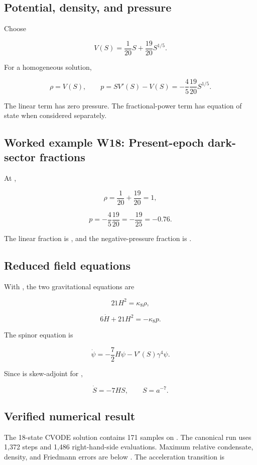 \documentclass[11pt]{article}
\begin{document}
\subsection{Potential, density, and pressure}

Choose

\[
V(S)=\frac1{20}S+\frac{19}{20}S^{1/5}.
\]

For a homogeneous solution,

\[
\rho=V(S),
\qquad
p=SV'(S)-V(S)=-\frac45\frac{19}{20}S^{1/5}.
\]

The linear term has zero pressure. The fractional-power term has equation of state \texttt{} when considered separately.

\subsection{Worked example W18: Present-epoch dark-sector fractions}

At \texttt{},

\[
\rho=\frac1{20}+\frac{19}{20}=1,
\]

\[
p=-\frac45\frac{19}{20}=-\frac{19}{25}=-0.76.
\]

The linear fraction is \texttt{}, and the negative-pressure fraction is \texttt{}.

\subsection{Reduced field equations}

With \texttt{}, the two gravitational equations are

\[
21H^2=\kappa_8\rho,
\]

\[
6\dot H+21H^2=-\kappa_8p.
\]

The spinor equation is

\[
\dot\psi=-\frac72H\psi-V'(S)\gamma^4\psi.
\]

Since \texttt{} is skew-adjoint for \texttt{},

\[
\dot S=-7HS,
\qquad S=a^{-7}.
\]

\subsection{Verified numerical result}

The 18-state CVODE solution contains 171 samples on \texttt{}. The canonical run uses 1,372 steps and 1,486 right-hand-side evaluations. Maximum relative condensate, density, and Friedmann errors are below \texttt{}. The acceleration transition is
\end{document}
